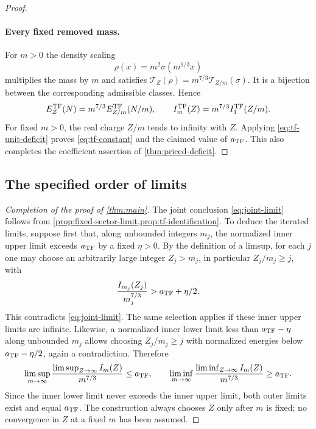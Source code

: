 \begin{proof}
\paragraph{Every fixed removed mass.}
For $m>0$ the density scaling
\[
 \rho(x)=m^2\sigma(m^{1/3}x)
\]
multiplies the mass by $m$ and satisfies
$\mathcal T_Z(\rho)=m^{7/3}\mathcal T_{Z/m}(\sigma)$.
It is a bijection between the corresponding admissible classes.  Hence
\begin{equation}\label{eq:tf-mass-scaling}
 E_Z^{\mathrm{TF}}(N)=m^{7/3}E_{Z/m}^{\mathrm{TF}}(N/m),\qquad
 I_m^{\mathrm{TF}}(Z)=m^{7/3}I_1^{\mathrm{TF}}(Z/m).
\end{equation}
For fixed $m>0$, the real charge $Z/m$ tends to infinity with $Z$.
Applying \cref{eq:tf-unit-deficit} proves \cref{eq:tf-constant} and the
claimed value of $a_{\mathrm{TF}}$.  This also completes the coefficient assertion
of \cref{thm:priced-deficit}.
\end{proof}

\subsection{The specified order of limits}

\begin{proof}[Completion of the proof of \cref{thm:main}]
The joint conclusion \cref{eq:joint-limit} follows from
\cref{prop:fixed-sector-limit,prop:tf-identification}.
To deduce the iterated limits, suppose first that, along unbounded integers
$m_j$, the normalized inner upper limit exceeds $a_{\mathrm{TF}}$ by a fixed
$\eta>0$.  By the definition of a limsup, for each $j$ one may choose an
arbitrarily large integer $Z_j>m_j$, in particular $Z_j/m_j\ge j$, with
\[
 \frac{I_{m_j}(Z_j)}{m_j^{7/3}}>a_{\mathrm{TF}}+\eta/2.
\]
This contradicts \cref{eq:joint-limit}.  The same selection applies if
these inner upper limits are infinite.  Likewise, a normalized inner lower
limit less than $a_{\mathrm{TF}}-\eta$ along unbounded $m_j$ allows choosing
$Z_j/m_j\ge j$ with normalized energies below $a_{\mathrm{TF}}-\eta/2$, again a
contradiction.  Therefore
\[
 \limsup_{m\to\infty}
       \frac{\limsup_{Z\to\infty}I_m(Z)}{m^{7/3}}\le a_{\mathrm{TF}},
 \qquad
 \liminf_{m\to\infty}
       \frac{\liminf_{Z\to\infty}I_m(Z)}{m^{7/3}}\ge a_{\mathrm{TF}}.
\]
Since the inner lower limit never exceeds the inner upper limit, both
outer limits exist and equal $a_{\mathrm{TF}}$.  The construction always chooses
$Z$ only after $m$ is fixed; no convergence in $Z$ at a fixed $m$ has been
assumed.
\end{proof}
